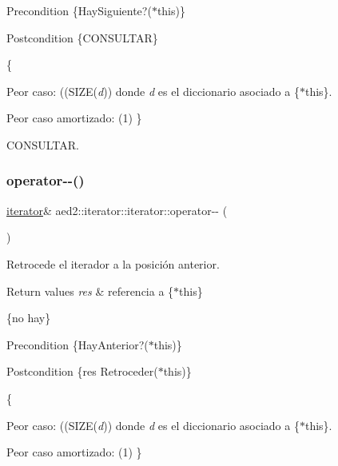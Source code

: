 \begin{DoxyPrecond}{Precondition}
\{Hay\+Siguiente?($\ast$this)\} 
\end{DoxyPrecond}
\begin{DoxyPostcond}{Postcondition}
\{C\+O\+N\+S\+U\+L\+T\+AR\}
\end{DoxyPostcond}
\{
\begin{DoxyItemize}
\item Peor caso\+: ((S\+I\+ZE({\itshape d})) donde {\itshape d} es el diccionario asociado a \{$\ast$this\}.
\item Peor caso amortizado\+: (1) \}
\end{DoxyItemize}

C\+O\+N\+S\+U\+L\+T\+AR. \mbox{\label{classaed2_1_1iterator_1_1iterator_a260692ee1d51f87ef547b4a798fc2de5}} 
\subsubsection{\texorpdfstring{operator-\/-\/()}{operator--()}\hspace{0.1cm}{\footnotesize\ttfamily [1/2]}}
{\footnotesize\ttfamily \hyperlink{classaed2_1_1iterator_1_1iterator}{iterator}\& aed2\+::iterator\+::iterator\+::operator-\/-\/ (\begin{DoxyParamCaption}{ }\end{DoxyParamCaption})\hspace{0.3cm}{\ttfamily [inline]}}



Retrocede el iterador a la posición anterior. 


\begin{DoxyRetVals}{Return values}
{\em res} & referencia a \{$\ast$this\}\\
\hline
\end{DoxyRetVals}
\{no hay\}

\begin{DoxyPrecond}{Precondition}
\{Hay\+Anterior?($\ast$this)\} 
\end{DoxyPrecond}
\begin{DoxyPostcond}{Postcondition}
\{res  Retroceder($\ast$this)\}
\end{DoxyPostcond}
\{
\begin{DoxyItemize}
\item Peor caso\+: ((S\+I\+ZE({\itshape d})) donde {\itshape d} es el diccionario asociado a \{$\ast$this\}.
\item Peor caso amortizado\+: (1) \}
\end{DoxyItemize}

